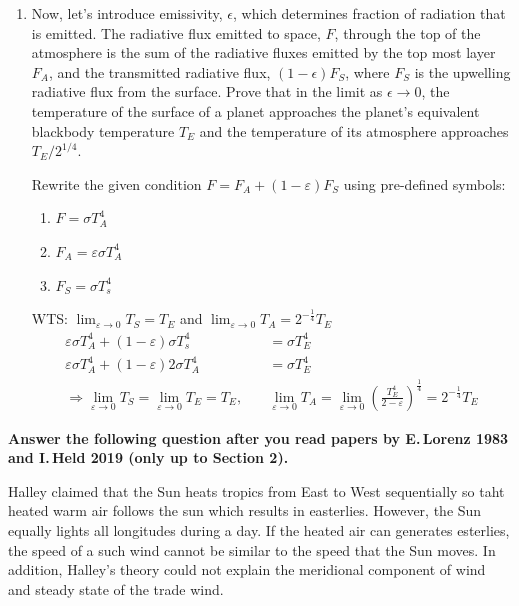\documentclass[11pt,a4paper]{article}
\begin{document}
\begin{enumerate}[label=(\alph*)]
\begin{solution}
    \end{solution}
    \item Now, let's introduce emissivity, $\epsilon$, which determines fraction of radiation that is emitted. The radiative flux emitted to space, $F$, through the top of the atmosphere is the sum of the radiative fluxes emitted by the top most layer $F_A$, and the transmitted radiative flux, $(1-\epsilon)F_S$, where $F_S$ is the upwelling radiative flux from the surface. Prove that in the limit as $\epsilon \to 0$, the temperature of the surface of a planet approaches the planet's equivalent blackbody temperature $T_E$ and the temperature of its atmosphere approaches $T_E / 2^{1/4}$.
    \begin{solution}
        Rewrite the given condition  $F = F_A + (1-\varepsilon)F_S$ using pre-defined symbols:
        \begin{enumerate}
            \item $F = \sigma T_A^4$
            \item $F_A = \varepsilon \sigma T_A^4$
            \item $F_S = \sigma T_s^4$
        \end{enumerate}
        WTS: $\displaystyle \lim_{\varepsilon \to 0 }T_S = T_E$ and $ \displaystyle \lim_{\varepsilon \to 0 }T_A = 2^{-\frac{1}{4}}T_E$
        \begin{align*}
            \varepsilon\sigma T_A^4 + (1-\varepsilon) \sigma T_s^4 &= \sigma T_E^4\\
            \varepsilon\sigma T_A^4 + (1-\varepsilon) 2\sigma T_A^4 &= \sigma T_E^4\\
            \Rightarrow\lim_{\varepsilon \to 0 }T_S = \lim_{\varepsilon \to 0 } T_E = T_E,\quad  &\lim_{\varepsilon \to 0 }T_A=\lim_{\varepsilon \to 0 }\left(\frac{T_E^4}{2-\varepsilon}\right)^\frac{1}{4}=2^{-\frac{1}{4}}T_E
        \end{align*}
    \end{solution}
\end{enumerate}

\newpage
\noindent\textbf{Answer the following question after you read papers by E.\,Lorenz 1983 and I.\,Held 2019 (only up to Section 2).}

\begin{solution}
    Halley claimed that the Sun heats tropics from East to West sequentially so taht heated warm air follows the sun which results in easterlies. However, the Sun equally lights all longitudes during a day. If the heated air can generates esterlies, the speed of a such wind cannot be similar to the speed that the Sun moves. In addition, Halley's theory could not explain the meridional component of wind and steady state of the trade wind. 
\end{solution}
\end{document}
